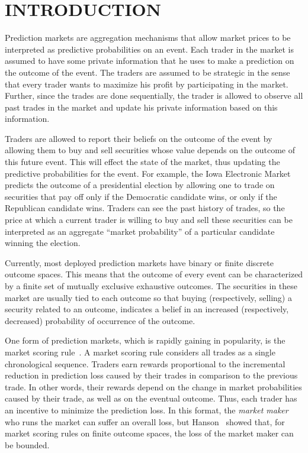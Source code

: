 \documentclass{article}
\begin{document}
\section{INTRODUCTION}
Prediction markets are aggregation mechanisms that allow market prices to be interpreted as predictive probabilities on an event. Each trader in the market is assumed to have some private information that he uses to make a prediction on the outcome of the event. The traders are assumed to be strategic in the sense that every trader wants to maximize his profit by participating in the market. Further, since the trades are done sequentially, the trader is allowed to observe all past trades in the market and update his private information based on this information.

Traders are allowed to report their beliefs on the outcome of the event by allowing them to buy and sell securities whose value depends on the outcome of this future event. This will effect the state of the market, thus updating the predictive probabilities for the event. For example, the Iowa Electronic Market predicts the outcome of a presidential election by allowing one to trade on securities that pay off only if the Democratic candidate wins, or only if the Republican candidate wins. Traders can see the past history of trades, so the price at which a current trader is willing to buy and sell these securities can be interpreted as an aggregate ``market probability'' of a particular candidate winning the election. 

Currently, most deployed prediction markets have binary or finite discrete outcome spaces. This means that the outcome of every event can be characterized by a finite set of mutually exclusive exhaustive outcomes. The securities in these market are usually tied to each outcome so that buying (respectively, selling) a security related to an outcome, indicates a belief in an increased (respectively, decreased) probability of occurrence of the outcome.

One form of prediction markets, which is rapidly gaining in popularity, is the market scoring rule~\cite{hanson03}. A market scoring rule considers all trades as a single chronological sequence. Traders earn rewards proportional to the incremental reduction in prediction loss caused by their trades in comparison to the previous trade. In other words, their rewards depend on the change in market probabilities caused by their trade, as well as on the eventual outcome. Thus, each trader has an 
incentive to minimize the prediction loss. In this format, the {\em market maker} who runs the market can suffer an overall loss, but Hanson~\cite{hanson03} showed that, for market scoring rules on finite outcome spaces, the loss of the market maker can be bounded.
\end{document}

